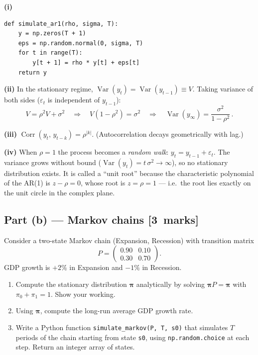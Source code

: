 \documentclass[11pt,a4paper]{article}
\newcommand{\mkpts}[1]{\hfill\textbf{[#1~marks]}}
\begin{document}
\begin{solution}
\textbf{(i)}
\begin{lstlisting}[numbers=none]
def simulate_ar1(rho, sigma, T):
    y = np.zeros(T + 1)
    eps = np.random.normal(0, sigma, T)
    for t in range(T):
        y[t + 1] = rho * y[t] + eps[t]
    return y
\end{lstlisting}

\textbf{(ii)} In the stationary regime, $\operatorname{Var}(y_t) = \operatorname{Var}(y_{t-1}) \equiv V$.  Taking variance of both sides ($\varepsilon_t$ is independent of $y_{t-1}$):
\[
V = \rho^2 V + \sigma^2 \quad\Longrightarrow\quad V(1-\rho^2) = \sigma^2 \quad\Longrightarrow\quad \boxed{\operatorname{Var}(y_\infty) = \frac{\sigma^2}{1-\rho^2}}\,.
\]

\textbf{(iii)} $\displaystyle\operatorname{Corr}(y_t,\, y_{t-k}) = \rho^{|k|}$. \quad (Autocorrelation decays geometrically with lag.)

\medskip

\textbf{(iv)} When $\rho=1$ the process becomes a \emph{random walk}: $y_t = y_{t-1} + \varepsilon_t$.  The variance grows without bound ($\operatorname{Var}(y_t) = t\,\sigma^2 \to \infty$), so no stationary distribution exists.  It is called a ``unit root'' because the characteristic polynomial of the AR(1) is $z - \rho = 0$, whose root is $z = \rho = 1$ --- i.e.\ the root lies exactly on the unit circle in the complex plane.
\end{solution}

\subsection*{Part (b) --- Markov chains \mkpts{3}}

Consider a two-state Markov chain (Expansion, Recession) with transition matrix
\[
P = \begin{pmatrix} 0.90 & 0.10 \\ 0.30 & 0.70 \end{pmatrix}.
\]
GDP growth is $+2\%$ in Expansion and $-1\%$ in Recession.

\begin{enumerate}[label=(\roman*),nosep]
\item Compute the stationary distribution $\boldsymbol{\pi}$ analytically by solving $\boldsymbol{\pi} P = \boldsymbol{\pi}$ with $\pi_0 + \pi_1 = 1$.  Show your working.
\item Using $\boldsymbol{\pi}$, compute the long-run average GDP growth rate.
\item Write a Python function \texttt{simulate\_markov(P, T, s0)} that simulates $T$ periods of the chain starting from state \texttt{s0}, using \texttt{np.random.choice} at each step.  Return an integer array of states.
\end{enumerate}
\end{document}
